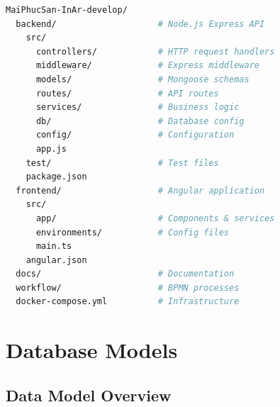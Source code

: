 \documentclass[11pt,a4paper,oneside,openany]{book}
\begin{document}
\begin{lstlisting}[language=bash,caption=Project Directory Layout,basicstyle=\ttfamily\footnotesize]
MaiPhucSan-InAr-develop/
  backend/                    # Node.js Express API
    src/
      controllers/            # HTTP request handlers
      middleware/             # Express middleware
      models/                 # Mongoose schemas
      routes/                 # API routes
      services/               # Business logic
      db/                     # Database config
      config/                 # Configuration
      app.js
    test/                     # Test files
    package.json
  frontend/                   # Angular application
    src/
      app/                    # Components & services
      environments/           # Config files
      main.ts
    angular.json
  docs/                       # Documentation
  workflow/                   # BPMN processes
  docker-compose.yml          # Infrastructure
\end{lstlisting}

\chapter{Database Models}

\section{Data Model Overview}
\end{document}
